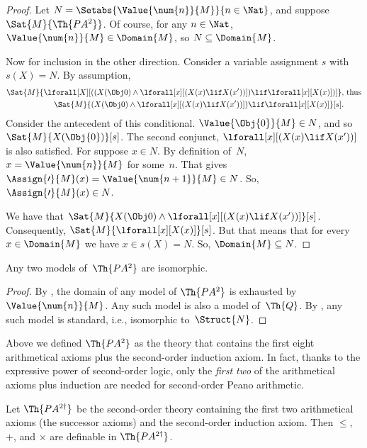 \documentclass[../../../include/open-logic-section]{subfiles}
\begin{document}
\begin{proof}
Let $N = \Setabs{\Value{\num{n}}{M}}{n \in \Nat}$, and suppose
$\Sat{M}{\Th{PA^2}}$. Of course, for any $n \in \Nat$,
$\Value{\num{n}}{M} \in \Domain{M}$, so $N \subseteq \Domain{M}$.

Now for inclusion in the other direction. Consider a variable
assignment $s$ with $s(X) = N$. By assumption,
\begin{align*}
\Sat{M}{\lforall[X][((X(\Obj 0) \land \lforall[x][(X(x)
      \lif X(x'))]) \lif \lforall[x][X(x)])]}, & \text{ thus}\\
\Sat{M}{(X(\Obj 0) \land \lforall[x][(X(x) \lif X(x'))]) \lif
  \lforall[x][X(x)]}[s]. & 
\end{align*}
Consider the antecedent of this conditional.  $\Value{\Obj{0}}{M} \in
N$, and so $\Sat{M}{X(\Obj{0})}[s]$.  The second conjunct,
$\lforall[x][(X(x) \lif X(x'))]$ is also satisfied. For suppose $x \in
N$. By definition of~$N$, $x = \Value{\num{n}}{M}$ for some~$n$.  That
gives $\Assign{\prime}{M}(x) = \Value{\num{n+1}}{M} \in N$. So,
$\Assign{\prime}{M}(x) \in N$.

We have that $\Sat{M}{X(\Obj 0) \land \lforall[x][(X(x) \lif X(x'))]}[s]$.
Consequently, $\Sat{M}{\lforall[x][X(x)]}[s]$. But that means that for
every $x \in \Domain{M}$ we have $x \in s(X) = N$. So, $\Domain{M}
\subseteq N$.
\end{proof}

\begin{cor}
Any two models of~$\Th{PA^2}$ are isomorphic.
\end{cor}

\begin{proof}
By , the domain of any model of $\Th{PA^2}$
is exhausted by $\Value{\num{n}}{M}$. Any such model is also a model
of~$\Th{Q}$. By , any such
model is standard, i.e., isomorphic to~$\Struct{N}$.
\end{proof}

Above we defined $\Th{PA^2}$ as the theory that contains the first eight 
arithmetical axioms plus the second-order induction axiom.  In fact, thanks
to the expressive power of second-order logic, only the \emph{first two} 
of the arithmetical axioms plus induction are needed for second-order Peano 
arithmetic.

\begin{prop}
Let $\Th{PA^{2\dagger}}$ be the second-order theory containing the
first two arithmetical axioms (the successor axioms) and the
second-order induction axiom. Then $\le$, $+$, and $\times$ are definable
in $\Th{PA^{2\dagger}}$.
\end{prop}
\end{document}
